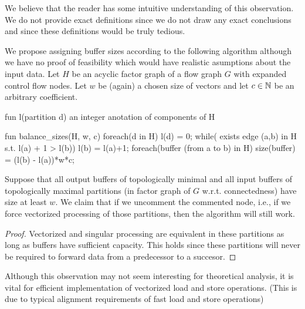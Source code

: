 We believe that the reader has some intuitive understanding of this observation. We do not provide exact definitions since we do not draw any exact conclusions and since these definitions would be truly tedious.


We propose assigning buffer sizes according to the following algorithm although we have no proof of feasibility which would have realistic asumptions about the input data. Let $H$ be an acyclic factor graph of a flow graph $G$ with expanded control flow nodes. Let $w$ be (again) a chosen size of vectors and let $c \in \mathbb{N}$ be an arbitrary coefficient.

\begin{samepage}
\begin{code}
fun l(partition d) { an integer anotation of components of H}

fun balance_sizes(H, w, c)
{
  foreach(d in H)
    l(d) = 0;
  while( exists edge (a,b) in H s.t. l(a) + 1 > l(b))
    l(b) = l(a)+1;
  foreach(buffer (from a to b) in H)
  {
    size(buffer) = (l(b) - l(a))*w*c;
  }
}
\end{code}
\end{samepage}

\begin{observation}
  Suppose that all output buffers of topologically minimal and all input buffers of topologically maximal partitions (in factor graph of $G$ w.r.t. connectedness) have size at least $w$. We claim that if we uncomment the commented node, i.e., if we force vectorized processing of those partitions, then the algorithm will still work.
  \begin{proof}
    Vectorized and singular processing are equivalent in these partitions as long as buffers have sufficient capacity. This holds since these partitions will never be required to forward data from a predecessor to a succesor. 
  \end{proof}
\end{observation}

\begin{rem} 
  Although this observation may not seem interesting for theoretical analysis, it is vital for efficient implementation of vectorized load and store operations. (This is due to typical alignment requirements of fast load and store operations)
\end{rem}

